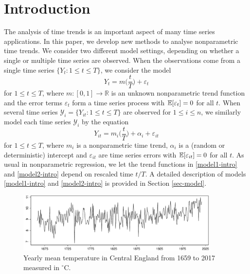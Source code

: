 
\section{Introduction}\label{sec-intro}


The analysis of time trends is an important aspect of many time series applications. In this paper, we develop new methods to analyse nonparametric time trends. 
We consider two different model settings, depending on whether a single or multiple time series are observed. When the observations come from a single time series $\{ Y_t: 1 \le t \le T \}$, we consider the model
\begin{equation}\label{model1-intro}
Y_t = m \Big( \frac{t}{T} \Big) + \varepsilon_t
\end{equation}
for $1 \le t \le T$, where $m: [0,1] \rightarrow \mathbb{R}$ is an unknown nonparametric trend function and the error terms $\varepsilon_t$ form a time series process with $\mathbb{E}[\varepsilon_t] = 0$ for all $t$. When several time series $\mathcal{Y}_i = \{ Y_{it}: 1 \le t \le T \}$ are observed for $1 \le i \le n$, we similarly model each time series $\mathcal{Y}_i$ by the equation
\begin{equation}\label{model2-intro}
Y_{it} = m_i \Big( \frac{t}{T} \Big) + \alpha_i + \varepsilon_{it}
\end{equation}
for $1 \le t \le T$, where $m_i$ is a nonparametric time trend, $\alpha_i$ is a (random or deterministic) intercept and $\varepsilon_{it}$ are time series errors with $\mathbb{E}[\varepsilon_{it}] = 0$ for all $t$. As usual in nonparametric regression, we let the trend functions in \eqref{model1-intro} and \eqref{model2-intro} depend on rescaled time $t/T$. A detailed description of models \eqref{model1-intro} and \eqref{model2-intro} is provided in Section \ref{sec-model}.


\begin{figure}
\centering
\includegraphics[width=0.9\textwidth]{Plots/temperature_data.pdf}
\vspace{0.15cm}

\caption{Yearly mean temperature in Central England from 1659 to 2017 measured in $^\circ$C.}\label{yearly_data}
\vspace{-0.15cm}
\end{figure}


